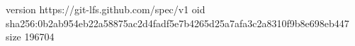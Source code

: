 version https://git-lfs.github.com/spec/v1
oid sha256:0b2ab954eb22a58875ac2d4fadf5e7b4265d25a7afa3c2a8310f9b8e698eb447
size 196704
